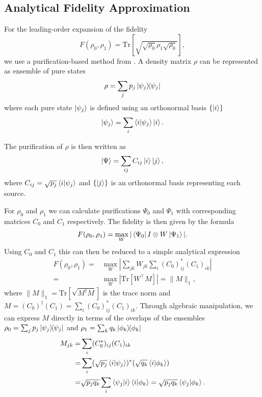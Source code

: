 \documentclass[reprint,amsmath,amssymb,aps,prl,floatfix,groupedaddress,superscriptaddress]{revtex4-2}
\begin{document}
\subsection{Analytical Fidelity Approximation} \label{app:fidelity_approximation}

For the leading-order expansion of the fidelity
\begin{equation}
F(\rho_0, \rho_1) = \text{Tr}\left[ \sqrt{\sqrt{\rho_0} \rho_1 \sqrt{\rho_0}}\right],
\end{equation}
we use a purification-based method from  \cite{lupo2020quantum}. A density matrix $\rho$ can be represented as ensemble of pure states
\begin{equation}
    \rho = \sum_j p_j \ketbra{\psi_j}{\psi_j}
\end{equation}
where each pure state $\ket{\psi_j}$ is defined using an orthonormal basis $\{\ket{i}\}$
\begin{equation}
\ket{\psi_j} = \sum_i \braket{i}{\psi_j} \ket{i}.
\end{equation}

The purification of $\rho$ is then written as
\begin{equation}
\ket{\Psi} = \sum_{ij} C_{ij} \ket{i} \ket{j},
\end{equation}
where $C_{ij} = \sqrt{p_j} \braket{i}{\psi_j}$ and $\{\ket{j}\}$ is an orthonormal basis representing each source.

For $\rho_0$ and $\rho_1$ we can calculate purifications $\Psi_0$ and $\Psi_1$ with corresponding matrices $C_0$ and $C_1$ respectively. The fidelity is then given by the formula
\begin{equation}
F(\rho_0, \rho_1) = \max_W |\bra{\Psi_0} I \otimes W \ket{\Psi_1}|.
\end{equation}
Using $C_0$ and $C_1$ this can then be reduced to a simple analytical expression
\begin{equation}
\begin{aligned}
F(\rho_0, \rho_1) =& \max_W \left| \sum_{jk} W_{jk} \sum_{i} (C_0)^*_{ij} (C_1)_{ik} \right| \\
=& \max_W \left| \text{Tr}[W^\top M] \right| = \|M\|_1,
\end{aligned}
\end{equation}
where $\|M\|_1 = \text{Tr}[\sqrt{M^\dagger M}]$ is the trace norm and $M = (C_0)^\dagger (C_1) = \sum_i (C_0)^*_{ij} (C_1)_{ik}$.
Through algebraic manipulation, we can express $M$ directly in terms of the overlaps of the ensembles $\rho_0 = \sum_j p_j \ketbra{\psi_j}{\psi_j}$ and $\rho_1  = \sum_k q_k \ketbra{\phi_k}{\phi_k}$
\begin{equation}
\begin{aligned}
M_{jk} =& \sum_i (C_0^*)_{ij} (C_1)_{ik}\\
= & \sum_{i} (\sqrt{p_j}\braket{i}{\psi_j})^*(\sqrt{q_k} \braket{i}{\phi_k})\\
= & \sqrt{p_j q_k} \sum_i \braket{\psi_j}{i} \braket{i}{\phi_k} = \sqrt{p_j q_k} \braket{\psi_j}{\phi_k}.
\end{aligned}
\end{equation}
\end{document}
